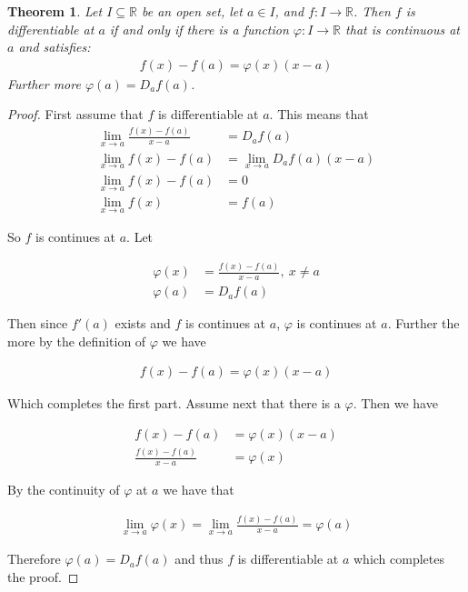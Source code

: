 \documentclass{article}
\theoremstyle{plain}
\newtheorem{theorem}{Theorem}
\theoremstyle{definition}
\begin{document}
\begin{theorem}
Let $I \subseteq \mathbb{R}$ be an open set, let $a \in I$, and $f:
I \rightarrow \mathbb{R}$. Then $f$ is differentiable at $a$ if and
only if there is a function $\varphi: I \rightarrow \mathbb{R}$ that is
continuous at $a$ and satisfies:
\begin{align}
    f(x)-f(a)=\varphi(x)(x-a)
\end{align}
Further more $\varphi(a)=D_a f(a)$.
\end{theorem}
\begin{proof}
First assume that $f$ is differentiable at $a$. This means that
\begin{align}
    \lim_{x \rightarrow a} \frac{f(x)-f(a)}{x-a} &=D_a f(a) \\
    \lim_{x \rightarrow a} f(x)-f(a) &= 
    \lim_{x \rightarrow a} D_a f(a) (x-a) \nonumber \\
    \lim_{x \rightarrow a} f(x)-f(a) &= 0 \nonumber \\
    \lim_{x \rightarrow a} f(x) &= f(a) \nonumber
\end{align}

So $f$ is continues at $a$. Let

\begin{align}
    \varphi(x) &= \frac{f(x)-f(a)}{x-a},\ x \neq a \\ \nonumber
    \varphi(a) &= D_a f(a)
\end{align}

Then since $f'(a)$ exists and $f$ is continues at $a$, $\varphi$ is
continues at $a$. Further the more by the definition of $\varphi$ we have

\begin{align}
    f(x)-f(a) = \varphi(x)(x-a)
\end{align}

Which completes the first part. Assume next that there is a
$\varphi$. Then we have

\begin{align}
    f(x)-f(a) &= \varphi(x)(x-a) \\
    \frac{f(x)-f(a)}{x-a} &= \varphi(x) \nonumber
\end{align}

By the continuity of $\varphi$ at $a$ we have that

\begin{align}
    \lim_{x \rightarrow a} \varphi(x) = \lim_{x \rightarrow a}
    \frac{f(x)-f(a)}{x-a} = \varphi(a)
\end{align}

Therefore $\varphi(a) = D_a f(a)$ and thus $f$ is differentiable at $a$
which completes the proof.
\end{proof}
\end{document}
